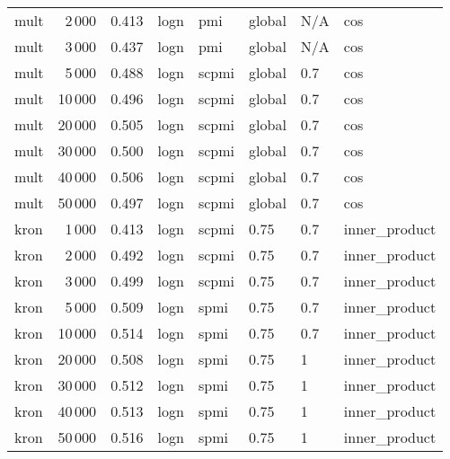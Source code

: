 \begin{tabular}{lrrlllll}
    mult &            2\,000 &  0.413 &  logn &    pmi &  global &  N/A &            cos \\
    mult &            3\,000 &  0.437 &  logn &    pmi &  global &  N/A &            cos \\
    mult &            5\,000 &  0.488 &  logn &  scpmi &  global &  0.7 &            cos \\
    mult &           10\,000 &  0.496 &  logn &  scpmi &  global &  0.7 &            cos \\
    mult &           20\,000 &  0.505 &  logn &  scpmi &  global &  0.7 &            cos \\
    mult &           30\,000 &  0.500 &  logn &  scpmi &  global &  0.7 &            cos \\
    mult &           40\,000 &  0.506 &  logn &  scpmi &  global &  0.7 &            cos \\
    mult &           50\,000 &  0.497 &  logn &  scpmi &  global &  0.7 &            cos \\
    kron &            1\,000 &  0.413 &  logn &  scpmi &    0.75 &  0.7 &  inner\_product \\
    kron &            2\,000 &  0.492 &  logn &  scpmi &    0.75 &  0.7 &  inner\_product \\
    kron &            3\,000 &  0.499 &  logn &  scpmi &    0.75 &  0.7 &  inner\_product \\
    kron &            5\,000 &  0.509 &  logn &   spmi &    0.75 &  0.7 &  inner\_product \\
    kron &           10\,000 &  0.514 &  logn &   spmi &    0.75 &  0.7 &  inner\_product \\
    kron &           20\,000 &  0.508 &  logn &   spmi &    0.75 &    1 &  inner\_product \\
    kron &           30\,000 &  0.512 &  logn &   spmi &    0.75 &    1 &  inner\_product \\
    kron &           40\,000 &  0.513 &  logn &   spmi &    0.75 &    1 &  inner\_product \\
    kron &           50\,000 &  0.516 &  logn &   spmi &    0.75 &    1 &  inner\_product \\
\bottomrule
\end{tabular}
